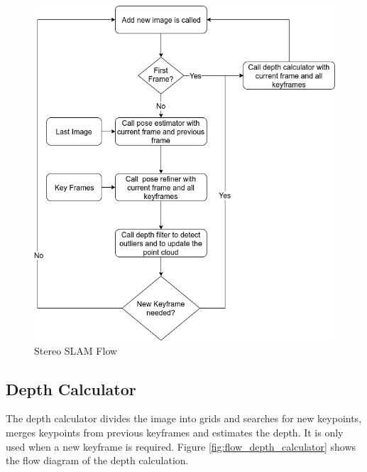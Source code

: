 \documentclass[11pt,a4paper,titlepage,oneside]{report}
\begin{document}
\begin{figure}[H]
  \centering
  \includegraphics[scale=0.3]{img/flow_stereo_slam.png}
  \caption{Stereo SLAM Flow}\label{fig:flow_stereo_slam}
\end{figure}


\subsection{Depth Calculator}

The depth calculator divides the image into grids and searches for new keypoints, merges keypoints from previous keyframes and estimates the depth. It is only used when a new keyframe is required. Figure \ref{fig:flow_depth_calculator} shows the flow diagram of the depth calculation.
\end{document}
